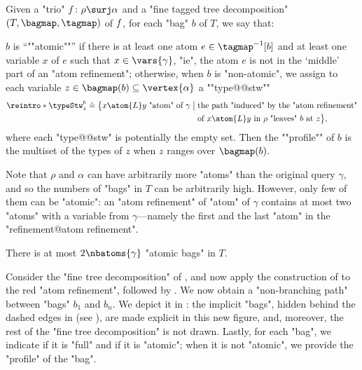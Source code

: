 \begin{definition}
    \AP Given a "trio" $\fun\colon \rho \surj \alpha$ and a "fine tagged tree decomposition"
    $(T, \bagmap, \tagmap)$ of $f$, for each "bag" $b$ of $T$, we say that:
    \begin{itemize}
        \itemAP $b$ is ``""atomic""'' if there is at least one atom $e \in \tagmap^{-1}[b]$ 
            and at least one variable $x$ of $e$ such that $x \in \vars{\gamma}$, "ie", the atom $e$ is not in the `middle' part of an "atom refinement";
        \itemAP otherwise, when $b$ is "non-atomic", we assign to each variable
            $z \in \bagmap(b) \subseteq \vertex{\alpha}$ a ""type@@stw""
            \begin{align*}
                \reintro*\typeStw_z^b \defeq
                \bigl\{ x \atom{L} y \text{ "atom" of $\gamma$} \;\big\vert\; {} &
                    \text{the path "induced" by the "atom refinement"} \\
                    &\text{of $x \atom{L} y$ in $\rho$ "leaves" $b$ at $z$}
                \bigr\},
            \end{align*}
			where each "type@@stw" is potentially the empty set.
            Then the ""profile"" of $b$ is the multiset of the types of $z$
            when $z$ ranges over $\bagmap(b)$.
    \end{itemize}
\end{definition}

Note that $\rho$ and $\alpha$ can have arbitrarily more "atoms" than the original query
$\gamma$, and so the numbers of "bags" in $T$ can be arbitrarily high. However,
only few of them can be "atomic": an "atom refinement" of "atom" of $\gamma$
contains at most two "atoms" with a variable from $\gamma$---namely the
first and the last "atom" in the "refinement@atom refinement".
\begin{fact}
	\AP\label{fact:bound-atomic-bags}
	There is at most $2 \nbatoms{\gamma}$ "atomic bags" in $T$.
\end{fact}


Consider the "fine tree decomposition" of , and now apply the construction of  to the red "atom refinement", followed by . We now obtain a "non-branching path"
between "bags" $b_1$ and $b_n$. We depict it in :
the implicit "bags", hidden behind the dashed edges in  (see ), are made explicit in this new figure, and, moreover, the rest of the "fine tree decomposition" is not drawn.
Lastly, for each "bag", we indicate if it is "full" and if it is "atomic"; when it is not "atomic", 
we provide the "profile" of the "bag".

